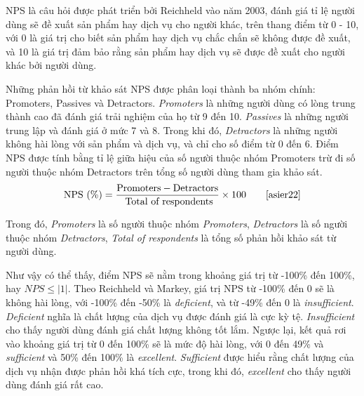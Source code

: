 NPS là câu hỏi được phát triển bởi Reichheld vào năm 2003, đánh giá tỉ lệ người dùng sẽ đề xuất sản phẩm hay dịch vụ cho người khác, trên thang điểm từ 0 - 10, với 0 là giá trị cho biết sản phẩm hay dịch vụ chắc chắn sẽ không được đề xuất, và 10 là giá trị đảm bảo rằng sản phẩm hay dịch vụ sẽ được đề xuất cho người khác bởi người dùng.
\par
Những phản hồi từ khảo sát NPS được phân loại thành ba nhóm chính: Promoters, Passives và Detractors. \emph{Promoters} là những người dùng có lòng trung thành cao đã đánh giá trải nghiệm của họ từ 9 đến 10. \emph{Passives} là những người trung lập và đánh giá ở mức 7 và 8. Trong khi đó, \emph{Detractors} là những người không hài lòng với sản phẩm và dịch vụ, và chỉ cho số điểm từ 0 đến 6. Điểm NPS được tính bằng tỉ lệ giữa hiệu của số người thuộc nhóm Promoters trừ đi số người thuộc nhóm Detractors trên tổng số người dùng tham gia khảo sát.
\[ \text{NPS (\%)} = \frac{\text{Promoters} - \text{Detractors}}{\text{ Total of respondents}} \times 100 \tag*{\cite{asier22}}\]
\par
Trong đó, \emph{Promoters} là số người thuộc nhóm \emph{Promoters}, \emph{Detractors} là số người thuộc nhóm \emph{Detractors}, \emph{Total of respondents} là tổng số phản hồi khảo sát từ người dùng.
\par
Như vậy có thể thấy, điểm NPS sẽ nằm trong khoảng giá trị từ -100\% đến 100\%, hay $NPS \le |1|$. Theo Reichheld và Markey, giá trị NPS từ -100\% đến 0 sẽ là không hài lòng, với -100\% đến -50\% là \emph{deficient}, và từ -49\% đến 0 là \emph{insufficient}. \emph{Deficient} nghĩa là chất lượng của dịch vụ được đánh giá là cực kỳ tệ. \emph{Insufficient} cho thấy người dùng đánh giá chất lượng không tốt lắm. Ngược lại, kết quả rơi vào khoảng giá trị từ 0 đến 100\% sẽ là mức độ hài lòng, với 0 đến 49\% và \emph{sufficient} và 50\% đến 100\% là \emph{excellent}. \emph{Sufficient} được hiểu rằng chất lượng của dịch vụ nhận được phản hồi khá tích cực, trong khi đó, \emph{excellent} cho thấy người dùng đánh giá rất cao.

